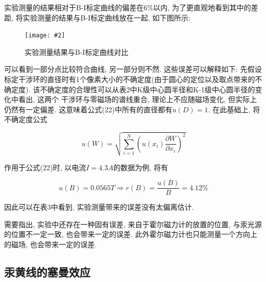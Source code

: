 \documentclass[12pt,a4paper]{article}
\newcommand{\be}[1]{
    \begin{equation}
        #1
    \end{equation}
}
\newcommand{\bfig}[3]{
    \begin{figure}[H]
        \centering
        \texttt{[image: \#2]}
        \caption{#3}
    \end{figure}
}
\begin{document}
    实验测量的结果相对于B-I标定曲线的偏差在6\%以内, 为了更直观地看到其中的差距, 将实验测量的结果与B-I标定曲线放在一起, 如下图所示: 
    \bfig{0.6}{磁场测量结果.jpg}{实验测量结果与B-I标定曲线对比}
可以看到一部分点比较符合曲线, 另一部分则不然. 这些误差可以解释如下: 先假设标定干涉环的直径时有1个像素大小的不确定度(由于圆心的定位以及取点带来的不确定度). 该不确定度的合理性可以从表2中K级中心圆半径和K-1级中心圆半径的变化中看出, 这两个
干涉环与零磁场的谱线重合, 理论上不应随磁场变化, 但实际上仍然有一定偏差. 这意味着公式(22)中所有的直径都有$u(D)=1$. 在此基础上, 将不确定度公式
\be{ u(W)=\sqrt{\sum_{i=1}^{N}\left(u\left(x_{i}\right) \frac{\partial W}{\partial x_{i}}\right)^{2}}}
作用于公式(22)时, 以电流$I=4.3A$的数据为例, 将有
\be{u(B)=0.0565T \Rightarrow r(B)=\frac{u(B)}{B}=4.12\%}
因此可以在表3中看到, 实验测量带来的误差没有太偏离估计.  

需要指出, 实验中还存在一种固有误差, 来自于霍尔磁力计的放置的位置, 与汞光源的位置不一定一致, 也会带来一定的误差. 此外霍尔磁力计也只能测量一个方向上的磁场, 也会带来一定的误差. 
\subsection{汞黄线的塞曼效应}
\end{document}
